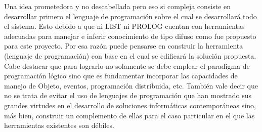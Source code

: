 Una idea prometedora y no descabellada pero eso si compleja consiste en desarrollar primero el lenguaje de programación sobre el cual se desarrollará todo el sistema.  Esto debido a que ni LIST ni PROLOG  cuentan con herramientas adecuadas para manejar e inferir conocimiento de tipo difuso como fue propuesto para este proyecto.  Por esa razón puede pensarse en construir la herramienta (lenguaje de programación) con base en el cual se edificará la solución propuesta.\\
Cabe destacar que para lograrlo no solamente se debe emplear el paradigma de programación lógico sino que es fundamentar incorporar las capacidades de manejo de Objeto, eventos, programación distribuida, etc. También vale decir que no se trata de evitar el uso de lenguajes de programación que han mostrado sus grandes virtudes en el desarrollo de soluciones informáticas contemporáneas sino, más bien, construir un complemento de ellas para el caso particular en el que las herramientas existentes son débiles.\\
